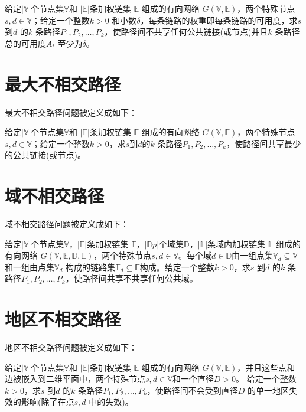 \begin{definition}[可用性不相交路径]
给定$|\mathbb{V}|$个节点集$\mathbb{V}$和 $|\mathbb{E}|$条加权链集 $\mathbb{E}$ 组成的有向网络 $G(\mathbb{V},\mathbb{E})$，两个特殊节点$s,d\in\mathbb{V}$；给定一个整数$k>0$ 和小数$\delta$，每条链路的权重即每条链路的可用度，求$s$ 到$d$ 的$k$ 条路径$P_1,P_2,\ldots,P_k$，使路径间不共享任何公共链接(或节点)并且$k$ 条路径总的可用度$A_t$ 至少为$\delta$。


\end{definition}
\section{最大不相交路径}
最大不相交路径问题被定义成如下：

\begin{definition}[最大不相交路径问题]
给定$|\mathbb{V}|$个节点集$\mathbb{V}$和 $|\mathbb{E}|$条加权链集 $\mathbb{E}$ 组成的有向网络 $G(\mathbb{V},\mathbb{E})$，两个特殊节点$s,d\in\mathbb{V}$；给定一个整数$k>0$，求$s$到$d$的$k$ 条路径$P_1,P_2,\ldots,P_k$，使路径间共享最少的公共链接(或节点)。
\end{definition}
\section{域不相交路径}
域不相交路径问题被定义成如下：

\begin{definition}[域不相交路径问题]
给定$|\mathbb{V}|$个节点集$\mathbb{V}$，$|\mathbb{E}|$条加权链集 $\mathbb{E}$，$|\mathbb{D}p|$个域集$\mathbb{D}$，$|\mathbb{L}|$条域内加权链集 $\mathbb{L}$ 组成的有向网络 $G(\mathbb{V},\mathbb{E},\mathbb{D},\mathbb{L})$，两个特殊节点$s,d\in\mathbb{V}$。每个域$d\in\mathbb{D}$由一组点集$\mathbb{V}_d\subseteq \mathbb{V}$和一组由点集$\mathbb{V}_d$ 构成的链路集$\mathbb{E}_d\subseteq \mathbb{E}$构成。给定一个整数$k>0$，求$s$ 到$d$ 的$k$ 条路径$P_1,P_2,\ldots,P_k$，使路径间共享不共享任何公共域。
\end{definition}

\section{地区不相交路径}
地区不相交路径问题被定义成如下：

\begin{definition}[地区不相交路径问题]
给定$|\mathbb{V}|$个节点集$\mathbb{V}$和 $|\mathbb{E}|$条加权链集 $\mathbb{E}$ 组成的有向网络 $G(\mathbb{V},\mathbb{E})$，并且这些点和边被嵌入到二维平面中，两个特殊节点$s,d\in\mathbb{V}$和一个直径$D>0$。 给定一个整数$k>0$，求$s$ 到$d$ 的$k$ 条路径$P_1,P_2,\ldots,P_k$，使路径间不会受到直径$D$ 的单一地区失效的影响(除了在点$s,d$ 中的失效)。
\end{definition}
